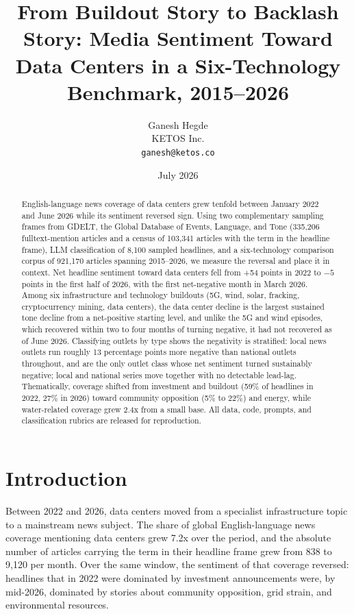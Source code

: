 \documentclass[11pt]{article}
\title{From Buildout Story to Backlash Story: Media Sentiment Toward
Data Centers in a Six-Technology Benchmark, 2015--2026}
\author{Ganesh Hegde\\
\small KETOS Inc.\\
\small \texttt{ganesh@ketos.co}}
\date{July 2026}
\begin{document}
\maketitle

\begin{abstract}
English-language news coverage of data centers grew tenfold between January
2022 and June 2026 while its sentiment reversed sign. Using two
complementary sampling frames from GDELT, the Global Database of Events,
Language, and Tone (335,206 fulltext-mention articles and a census of
103,341 articles with the term in the headline frame), LLM classification of
8,100 sampled headlines, and a six-technology comparison corpus of 921,170
articles spanning 2015--2026, we measure the reversal and place it in
context. Net headline sentiment toward data centers fell from +54 points in
2022 to $-5$ points in the first half of 2026, with the first net-negative
month in March 2026. Among six infrastructure and technology buildouts (5G,
wind, solar, fracking, cryptocurrency mining, data centers), the data center
decline is the largest sustained tone decline from a net-positive starting
level, and unlike the 5G and wind episodes, which recovered within two to
four months of turning negative, it had not recovered as of June 2026.
Classifying outlets by type shows the negativity is stratified: local news
outlets run roughly 13 percentage points more negative than national outlets
throughout, and are the only outlet class whose net sentiment turned
sustainably negative; local and national series move together with no
detectable lead-lag. Thematically, coverage shifted from investment and
buildout (59\% of headlines in 2022, 27\% in 2026) toward community
opposition (5\% to 22\%) and energy, while water-related coverage grew 2.4x
from a small base. All data, code, prompts, and classification rubrics are
released for reproduction.
\end{abstract}

\section{Introduction}

Between 2022 and 2026, data centers moved from a specialist infrastructure
topic to a mainstream news subject. The share of global English-language news
coverage mentioning data centers grew 7.2x over the period, and the absolute
number of articles carrying the term in their headline frame grew from 838 to
9,120 per month. Over the same window, the sentiment of that coverage
reversed: headlines that in 2022 were dominated by investment announcements
were, by mid-2026, dominated by stories about community opposition, grid
strain, and environmental resources.
\end{document}
